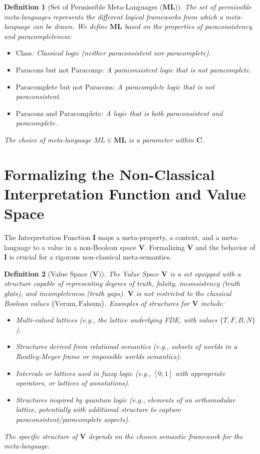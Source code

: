 \documentclass{article}
\newcommand{\ContextParams}{\mathbf{C}}
\newcommand{\InterpFunc}{\mathbf{I}}
\newcommand{\ValueSpace}{\mathbf{V}}
\newcommand{\MetaLang}{\mathbf{ML}}
\newcommand{\MLClass}{\text{Class}}
\newcommand{\MLParacons}{\text{Paracons but not Paracomp}}
\newcommand{\MLParacomp}{\text{Paracomplete but not Paracons}}
\newcommand{\MLBoth}{\text{Paracons and Paracomplete}}
\newtheorem{definition}{Definition}[section] %
\begin{document}
	\begin{definition}[Set of Permissible Meta-Languages ($\MetaLang$)]
		The set of permissible meta-languages represents the different logical frameworks from which a meta-language can be drawn. We define $\MetaLang$ based on the properties of paraconsistency and paracompleteness:
		\begin{itemize}[nosep] %
			\item $\MLClass$: Classical logic (neither paraconsistent nor paracomplete).
			\item $\MLParacons$: A paraconsistent logic that is not paracomplete.
			\item $\MLParacomp$: A paracomplete logic that is not paraconsistent.
			\item $\MLBoth$: A logic that is both paraconsistent and paracomplete.
		\end{itemize}
		The choice of meta-language $ML \in \MetaLang$ is a parameter within $\ContextParams$.
	\end{definition}
	
	\section{Formalizing the Non-Classical Interpretation Function and Value Space}
	
	The Interpretation Function $\InterpFunc$ maps a meta-property, a context, and a meta-language to a value in a non-Boolean space $\ValueSpace$. Formalizing $\ValueSpace$ and the behavior of $\InterpFunc$ is crucial for a rigorous non-classical meta-semantics.
	
	\begin{definition}[Value Space ($\ValueSpace$)]
		The Value Space $\ValueSpace$ is a set equipped with a structure capable of representing degrees of truth, falsity, inconsistency (truth gluts), and incompleteness (truth gaps). $\ValueSpace$ is not restricted to the classical Boolean values $\{\text{Verum}, \text{Falsum}\}$. Examples of structures for $\ValueSpace$ include:
		\begin{itemize}[wide, labelwidth=!, labelindent=0pt, before=\RaggedRight, after=\RaggedRight] %
			\item Multi-valued lattices (e.g., the lattice underlying FDE, with values $\{T, F, B, N\}$).
			\item Structures derived from relational semantics (e.g., subsets of worlds in a Routley-Meyer frame or impossible worlds semantics).
			\item Intervals or lattices used in fuzzy logic (e.g., $[0,1]$ with appropriate operators, or lattices of annotations).
			\item Structures inspired by quantum logic (e.g., elements of an orthomodular lattice, potentially with additional structure to capture paraconsistent/paracomplete aspects).
			\end{itemize}
				The specific structure of $\ValueSpace$ depends on the chosen semantic framework for the meta-language.
				\end{definition}
					
\end{document}
